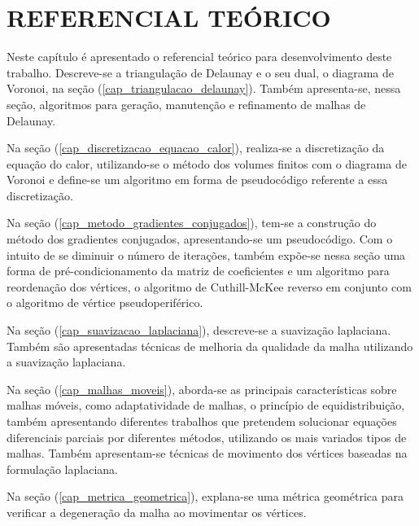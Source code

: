 \section{REFERENCIAL TEÓRICO}
\label{cap:referencial_teorico}

Neste capítulo é apresentado o referencial teórico para desenvolvimento deste trabalho. Descreve-se a triangulação de Delaunay e o seu dual, o diagrama de Voronoi, na seção (\ref{cap_triangulacao_delaunay}). Também apresenta-se, nessa seção, algoritmos para geração, manutenção e refinamento de malhas de Delaunay.

Na seção (\ref{cap_discretizacao_equacao_calor}), realiza-se a discretização da equação do calor, utilizando-se o método dos volumes finitos com o diagrama de Voronoi e define-se um algoritmo em forma de pseudocódigo referente a essa discretização. 

Na seção (\ref{cap_metodo_gradientes_conjugados}), tem-se a construção do método dos gradientes conjugados, apresentando-se um pseudocódigo. Com o intuito de se diminuir o número de iterações, também expõe-se nessa seção uma forma de pré-condicionamento da matriz de coeficientes e um algoritmo para reordenação dos vértices, o algoritmo de Cuthill-McKee reverso em conjunto com o algoritmo de vértice pseudoperiférico.

Na seção (\ref{cap_suavizacao_laplaciana}), descreve-se a suavização laplaciana. Também são apresentadas técnicas de melhoria da qualidade da malha utilizando a suavização laplaciana.

Na seção (\ref{cap_malhas_moveis}), aborda-se as principais características sobre malhas móveis, como adaptatividade de malhas, o princípio de equidistribuição, também apresentando diferentes trabalhos que pretendem solucionar equações diferenciais parciais por diferentes métodos, utilizando os mais variados tipos de malhas. Também apresentam-se técnicas de movimento dos vértices baseadas na formulação laplaciana.

Na seção (\ref{cap_metrica_geometrica}), explana-se uma métrica geométrica para verificar a degeneração da malha ao movimentar os vértices.




 

 

 


